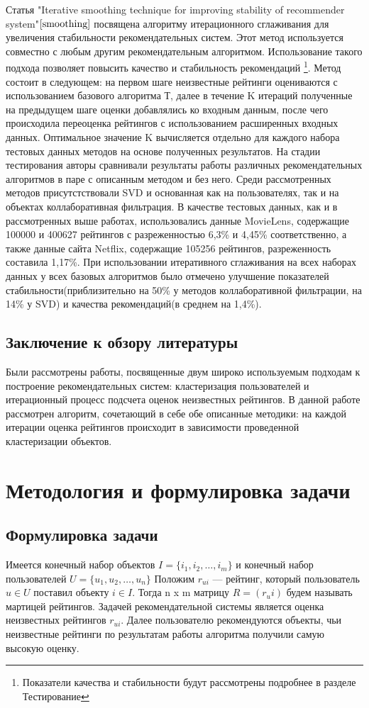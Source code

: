 \documentclass[12pt]{article} %
\begin{document}
\par
Статья "Iterative smoothing technique for improving stability of recommender system"$\cite{smoothing}$ посвящена алгоритму итерационного сглаживания для увеличения стабильности рекомендательных систем. Этот метод используется совместно с любым другим рекомендательным алгоритмом. Использование такого подхода позволяет повысить качество и стабильность рекомендаций \footnote{Показатели качества и стабильности будут рассмотрены подробнее в разделе Тестирование}. Метод состоит в следующем: на первом шаге неизвестные рейтинги оцениваются с использованием базового алгоритма Т, далее в течение K итераций полученные на предыдущем шаге оценки добавлялись ко входным данным, после чего происходила переоценка рейтингов с использованием расширенных входных данных. Оптимальное значение K вычисляется отдельно для каждого набора тестовых данных методов на основе полученных результатов. На стадии тестирования авторы сравнивали результаты работы различных рекомендательных алгоритмов в паре с описанным методом и без него. Среди рассмотренных методов присутстствовали SVD и основанная как на пользователях, так и на объектах коллаборативная фильтрация. В качестве тестовых данных, как и в рассмотренных выше работах, использовались данные MovieLens, содержащие 100000 и 400627 рейтингов с разреженностью 6,3\% и 4,45\% соответственно, а также данные сайта Netflix, содержащие 105256 рейтингов, разреженность составила 1,17\%. При использовании итеративного сглаживания на всех наборах данных у всех базовых алгоритмов было отмечено улучшение показателей стабильности(приблизительно на 50\% у методов коллаборативной фильтрации, на 14\% у SVD) и качества рекомендаций(в среднем на 1,4\%). 

\subsection{Заключение к обзору литературы}
Были рассмотрены работы, посвященные двум широко используемым подходам к построение рекомендательных систем: кластеризация пользователей и итерационный процесс подсчета оценок неизвестных рейтингов. В данной работе рассмотрен алгоритм, сочетающий в себе обе описанные методики: на каждой итерации оценка рейтингов происходит в зависимости проведенной кластеризации объектов.


\section{Методология и формулировка задачи}
\subsection{Формулировка задачи}
Имеется конечный набор объектов $I=\{i_{1}, i_{2}, \dots, i_{m}\}$ и конечный набор пользователей $U=\{u_{1}, u_{2}, \dots, u_{n}\}$
Положим $r_{ui}$ --- рейтинг, который пользователь $u\in U$ поставил объекту $i\in I$. Тогда n x m матрицу  $R = (r_ui) $ будем называть мартицей рейтингов. Задачей рекомендательной системы является оценка неизвестных рейтингов $r_{ui}$. Далее пользователю рекомендуются объекты, чьи неизвестные рейтинги по результатам работы алгоритма получили самую высокую оценку.
\end{document}
